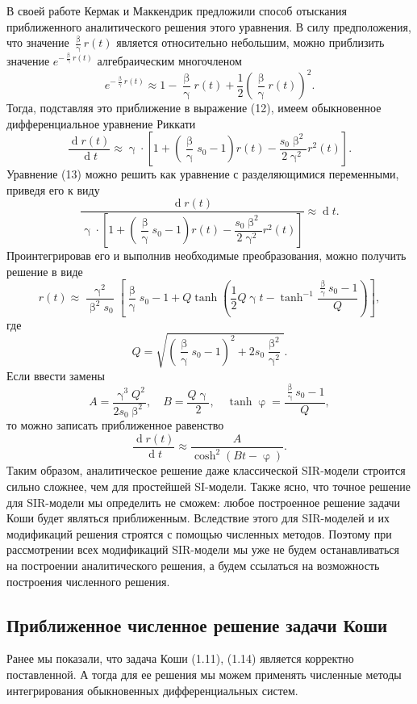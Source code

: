 \documentclass[a4paper, 14pt]{extreport}
\numberwithin{equation}{section}
\renewcommand{\beta}{\upbeta}
\renewcommand{\gamma}{\upgamma}
\renewcommand{\varphi}{\upvarphi}
\renewcommand{\d}{\operatorname{d}}
\begin{document}
	В своей работе Кермак и Маккендрик предложили способ отыскания приближенного аналитического решения этого уравнения. В силу предположения, что значение $\frac{\beta}{\gamma} r(t)$ является относительно небольшим, можно приблизить значение $e^{-\frac \beta \gamma r(t)}$ алгебраическим многочленом $$e^{-\frac \beta \gamma r(t)} \approx 1 - \frac \beta \gamma r(t) + \dfrac12\left(\dfrac\beta\gamma r(t)\right)^2.$$
	Тогда, подставляя это приближение в выражение (12), имеем обыкновенное дифференциальное уравнение Риккати 
	\begin{equation}
		\dfrac{\d r(t)}{\d t} \approx \gamma\cdot \left[1 + \left(\dfrac\beta\gamma s_0 - 1\right)r(t) - \dfrac{s_0\beta ^2}{2 \gamma ^2}r^2(t)\right].
	\end{equation}
	Уравнение (13) можно решить как уравнение с разделяющимися переменными, приведя его к виду 
	$$\dfrac{\d r(t)}{\gamma\cdot \left[1 + \left(\dfrac\beta\gamma s_0 - 1\right)r(t) - \dfrac{s_0\beta ^2}{2 \gamma ^2}r^2(t)\right]} \approx \d t.$$
	Проинтегрировав его и выполнив необходимые преобразования, можно получить решение в виде
	\begin{equation}
		r(t)\approx \dfrac{\gamma^2}{\beta^2 s_0}\left[\dfrac{\beta}{\gamma}s_0 - 1 + Q \tanh \left(\dfrac 12Q \gamma t - \tanh^{-1}\dfrac{\frac \beta \gamma s_0 - 1}{Q} \right)\right],
	\end{equation}
	где $$Q = \sqrt{\left(\dfrac \beta \gamma s_0 - 1\right)^2 + 2s_0\dfrac{\beta^2}{\gamma^2}}.$$
	Если ввести замены $$A = \dfrac{\gamma^3 Q^2}{2 s_0 \beta^2},\quad B = \dfrac{Q \gamma }{2},\quad \tanh \varphi = \dfrac{\frac \beta \gamma s_0 - 1}Q,$$
	то можно записать приближенное равенство 
	\begin{equation}
		\dfrac{\d r(t)}{\d t} \approx \dfrac{A}{\cosh^2 (Bt - \varphi)}.
	\end{equation}
	Таким образом, аналитическое решение даже классической SIR-модели строится сильно сложнее, чем для простейшей SI-модели. Также ясно, что точное решение для SIR-модели мы определить не сможем: любое построенное решение задачи Коши будет являться приближенным. Вследствие этого для SIR-моделей и их модификаций решения строятся с помощью численных методов. Поэтому при рассмотрении всех модификаций SIR-модели мы уже не будем останавливаться на построении аналитического решения, а будем ссылаться на возможность построения численного решения.
	\subsection{Приближенное численное решение задачи Коши}
	Ранее мы показали, что задача Коши (1.11), (1.14) является корректно поставленной. А тогда для ее решения мы можем применять численные методы интегрирования обыкновенных дифференциальных систем.
	
\end{document}
